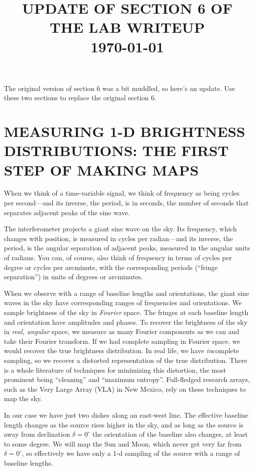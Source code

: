 \documentclass[11pt,preprint]{aastex}
\begin{document}
\def\simlt{\lower.5ex\hbox{$\; \buildrel < \over \sim \;$}}
\def\simgt{\lower.5ex\hbox{$\; \buildrel > \over \sim \;$}}


\title {UPDATE OF SECTION 6 OF THE LAB WRITEUP \\ \today}

The original version of section 6 was a bit muddled, so here's an
update. Use these two sections to replace the original section 6.


\section{MEASURING 1-D BRIGHTNESS DISTRIBUTIONS: THE FIRST STEP OF
MAKING MAPS} \label{mun}

	When we think of a time-variable signal, we think of frequency
as being cycles per second---and its inverse, the period, is in seconds,
the number of seconds that separates adjacent peaks of the sine wave. 

	The interferometer projects a giant sine wave on the sky. Its
frequency, which changes with position, is measured in cycles per
radian---and its inverse, the period, is the angular separation of
adjacent peaks, measured in the angular units of radians. You can, of
course, also think of frequency in terms of cycles per degree or cycles
per arcminute, with the corresponding periods (``fringe separation'') in
units of degrees or arcminutes. 

	When we observe with a range of baseline lengths and
orientations, the giant sine waves in the sky have corresponding ranges
of frequencies and orientations. We sample brightness of the sky in {\it
Fourier} space. The fringes at each baseline length and orientation have
amplitudes and phases. To recover the brightness of the sky in {\it
real, angular} space, we measure as many Fourier components as we can
and take their Fourier transform. If we had complete sampling in Fourier
space, we would recover the true brightness distribution. In real life,
we have {\it in}complete sampling, so we recover a distorted
representation of the true distribution. There is a whole literature 
of techniques for minimizing this distortion, the most prominent being
``cleaning'' and ``maximum entropy''. Full-fledged research arrays, such
as the Very Large Array (VLA) in New Mexico, rely on these techniques to
map the sky.

	In our case we have just two dishes along an east-west line. The
effective baseline length changes as the source rises higher in the sky,
and as long as the source is away from declination $\delta = 0^\circ$ the
orientation of the baseline also changes, at least to some degree. We
will map the Sun and Moon, which never get very far from $\delta =
0^\circ$, so effectively we have only a 1-d sampling of the source with
a range of baseline lengths. 
\end{document}
